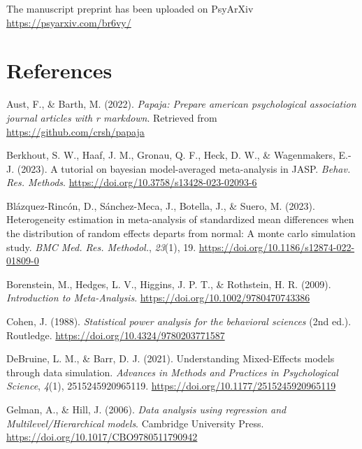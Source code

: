 \documentclass[
  man,floatsintext]{apa6}
\newlength{\cslhangindent}
\newlength{\cslentryspacingunit} %
\newenvironment{CSLReferences}[2] %
 {%
  \setlength{\parindent}{0pt}
  \ifodd #1
  \let\oldpar\par
  \def\par{\hangindent=\cslhangindent\oldpar}
  \fi
  \setlength{\parskip}{#2\cslentryspacingunit}
 }%
 {}
\begin{document}
The manuscript preprint has been uploaded on PsyArXiv \url{https://psyarxiv.com/br6vy/}

\newpage

\hypertarget{references}{%
\section*{References}\label{references}}

\hypertarget{refs}{}
\begin{CSLReferences}{1}{0}
\leavevmode{}%
Aust, F., \& Barth, M. (2022). \emph{Papaja: Prepare american psychological association journal articles with r markdown}. Retrieved from \url{https://github.com/crsh/papaja}

\leavevmode{}%
Berkhout, S. W., Haaf, J. M., Gronau, Q. F., Heck, D. W., \& Wagenmakers, E.-J. (2023). A tutorial on bayesian model-averaged meta-analysis in {JASP}. \emph{Behav. Res. Methods}. \url{https://doi.org/10.3758/s13428-023-02093-6}

\leavevmode{}%
Blázquez-Rincón, D., Sánchez-Meca, J., Botella, J., \& Suero, M. (2023). Heterogeneity estimation in meta-analysis of standardized mean differences when the distribution of random effects departs from normal: A monte carlo simulation study. \emph{BMC Med. Res. Methodol.}, \emph{23}(1), 19. \url{https://doi.org/10.1186/s12874-022-01809-0}

\leavevmode{}%
Borenstein, M., Hedges, L. V., Higgins, J. P. T., \& Rothstein, H. R. (2009). \emph{Introduction to {Meta-Analysis}}. \url{https://doi.org/10.1002/9780470743386}

\leavevmode{}%
Cohen, J. (1988). \emph{Statistical power analysis for the behavioral sciences} (2nd ed.). Routledge. \url{https://doi.org/10.4324/9780203771587}

\leavevmode{}%
DeBruine, L. M., \& Barr, D. J. (2021). Understanding {Mixed-Effects} models through data simulation. \emph{Advances in Methods and Practices in Psychological Science}, \emph{4}(1), 2515245920965119. \url{https://doi.org/10.1177/2515245920965119}

\leavevmode{}%
Gelman, A., \& Hill, J. (2006). \emph{Data analysis using regression and {Multilevel/Hierarchical} models}. Cambridge University Press. \url{https://doi.org/10.1017/CBO9780511790942}


\end{CSLReferences}
\end{document}
